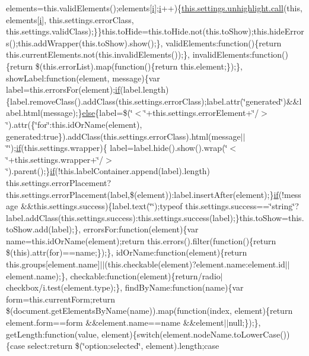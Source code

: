 \begin{DoxyCompactItemize}
elements=this.\+valid\+Elements();elements\mbox{[}\hyperlink{_scripts_2respond_8min_8js_a5e25b1d1bed9ab5f3174b76d6a722180}{i}\mbox{]};\hyperlink{_scripts_2respond_8min_8js_a5e25b1d1bed9ab5f3174b76d6a722180}{i}++)\{\hyperlink{_scripts_2dropzone_8js_aafc46d047b4d7639fd2c4b927ec5048c}{this.\+settings.\+unhighlight.\+call}(this, elements\mbox{[}\hyperlink{_scripts_2respond_8min_8js_a5e25b1d1bed9ab5f3174b76d6a722180}{i}\mbox{]}, this.\+settings.\+error\+Class, this.\+settings.\+valid\+Class);\}\}this.\+to\+Hide=this.\+to\+Hide.\+not(this.\+to\+Show);this.\+hide\+Errors();this.\+add\+Wrapper(this.\+to\+Show).show();\}, valid\+Elements\+:function()\{return this.\+current\+Elements.\+not(this.\+invalid\+Elements());\}, invalid\+Elements\+:function()\{return \$(this.\+error\+List).map(function()\{return this.\+element;\});\}, show\+Label\+:function(element, message)\{var label=this.\+errors\+For(element);\hyperlink{_scripts_2respond_8min_8js_a93851d60dd037a83509a1757b9ee7b66}{if}(label.\+length)\{label.\+remove\+Class().add\+Class(this.\+settings.\+error\+Class);label.\+attr(\char`\"{}generated\char`\"{})\&\&label.\+html(message);\}\hyperlink{_scripts_2jquery_8validate_8js_a0544c3fe466e421738dae463968b70ba}{else}\{label=\$(\char`\"{}$<$\char`\"{}+this.\+settings.\+error\+Element+\char`\"{}/$>$\char`\"{}).attr(\{\char`\"{}for\char`\"{}\+:this.\+id\+Or\+Name(element), generated\+:true\}).add\+Class(this.\+settings.\+error\+Class).html(message$\vert$$\vert$\char`\"{}\char`\"{});\hyperlink{_scripts_2respond_8min_8js_a93851d60dd037a83509a1757b9ee7b66}{if}(this.\+settings.\+wrapper)\{   label=label.\+hide().show().wrap(\char`\"{}$<$\char`\"{}+this.\+settings.\+wrapper+\char`\"{}/$>$\char`\"{}).parent();\}\hyperlink{_scripts_2respond_8min_8js_a93851d60dd037a83509a1757b9ee7b66}{if}(!this.\+label\+Container.\+append(label).length) this.\+settings.\+error\+Placement?this.\+settings.\+error\+Placement(label,\$(element))\+:label.\+insert\+After(element);\}\hyperlink{_scripts_2respond_8min_8js_a93851d60dd037a83509a1757b9ee7b66}{if}(!message \&\&this.\+settings.\+success)\{label.\+text(\char`\"{}\char`\"{});typeof this.\+settings.\+success==\char`\"{}string\char`\"{}?label.\+add\+Class(this.\+settings.\+success)\+:this.\+settings.\+success(label);\}this.\+to\+Show=this.\+to\+Show.\+add(label);\}, errors\+For\+:function(element)\{var name=this.\+id\+Or\+Name(element);return this.\+errors().filter(function()\{return \$(this).attr(\textquotesingle{}for\textquotesingle{})==name;\});\}, id\+Or\+Name\+:function(element)\{return this.\+groups\mbox{[}element.\+name\mbox{]}$\vert$$\vert$(this.\+checkable(element)?element.\+name\+:element.\+id$\vert$$\vert$element.\+name);\}, checkable\+:function(element)\{return/radio$\vert$checkbox/i.\+test(element.\+type);\}, find\+By\+Name\+:function(name)\{var form=this.\+current\+Form;return \$(document.\+get\+Elements\+By\+Name(name)).map(function(index, element)\{return element.\+form==form \&\&element.\+name==name \&\&element$\vert$$\vert$null;\});\}, get\+Length\+:function(value, element)\{switch(element.\+node\+Name.\+to\+Lower\+Case())\{case \textquotesingle{}select\textquotesingle{}\+:return \$(\char`\"{}option\+:selected\char`\"{}, element).length;case 
\end{DoxyCompactItemize}
